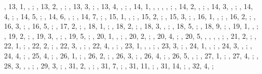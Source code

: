 \begin{autindex}
    , 13,  1, , ;
    , 13,  2, , ;
    , 13,  3, ;
    , 13,  4, , ;
    , 14,  1, , , , , 
		;
    , 14,  2, , ;
    , 14,  3, , ;
    , 14,  4, ;
    , 14,  5, ;
    , 14,  6, , ;
    , 14,  7, ;
    , 15,  1, , ;
    , 15,  2, ;
    , 15,  3, ;
    , 16,  1, , ;
    , 16,  2, ;
    , 16,  3, ;
    , 16,  5, ;
    , 17,  2, ;
    , 18,  1, ;
    , 18,  2, ;
    , 18,  3, , ;
    , 18,  5, ;
    , 18,  9, ;
    , 19,  1, , ;
    , 19,  2, ;
    , 19,  3, , ;
    , 19,  5, ;
    , 20,  1, , ;
    , 20,  2, ;
    , 20,  4, ;
    , 20,  5, , , ,
                                       , ;
    , 21,  2, ;
    , 22,  1, ;
    , 22,  2, ;
    , 22,  3, , ;
    , 22,  4, , ;
    , 23,  1, , , ;
    , 23,  3, ;
    , 24,  1, , ;
    , 24,  3, , ;
    , 24,  4, ;
    , 25,  4, ;
    , 26,  1, ;
    , 26,  2, ;
    , 26,  3, ;
    , 26,  4, ;
    , 26,  5, , ;
    , 27,  1, ;
    , 27,  4, ;
    , 28,  3, , , ;
    , 29,  3, ;
    , 31,  2, , ;
    , 31,  7, ;
    , 31, 11, ;
    , 31, 14, ;
    , 32,  4, ;

\end{autindex}
